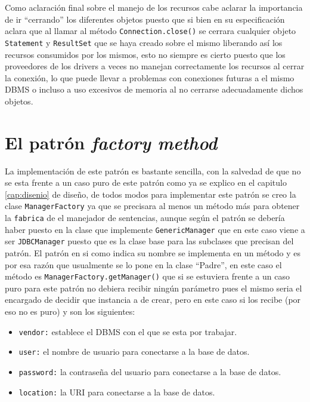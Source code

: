Como aclaración final sobre el manejo de los recursos cabe aclarar la importancia de ir ``cerrando'' los diferentes objetos puesto que si bien \jd en su especificación aclara que al llamar al método \verb=Connection.close()= se cerrara cualquier objeto \verb=Statement= y \verb=ResultSet= que se haya creado sobre el mismo liberando así los recursos consumidos por los mismos, esto no siempre es cierto puesto que los proveedores de los drivers \jd a veces no manejan correctamente los recursos al cerrar la conexión, lo que puede llevar a problemas con conexiones futuras a el mismo DBMS o incluso a uso excesivos de memoria al no cerrarse adecuadamente dichos objetos.
%
\section{El patrón \textit{factory method}}
La implementación de este patrón es bastante sencilla, con la salvedad de que no se esta frente a un caso puro de este patrón como ya se explico en el capitulo \ref{cap:disenio} de diseño, de todos modos para implementar este patrón se creo la clase \verb=ManagerFactory= ya que se precisara al menos un método más para obtener la \verb=fabrica= de el manejador de sentencias,  aunque según el patrón se debería haber puesto en la clase que implemente \verb=GenericManager= que en este caso viene a ser \verb=JDBCManager= puesto que es la clase base para las subclases que precisan del patrón. El patrón en si como indica su nombre se implementa en un método y es por esa razón que usualmente se lo pone en la clase ``Padre'', en este caso el método es \verb=ManagerFactory.getManager()= que si se estuviera frente a un caso puro para este patrón no debiera recibir ningún parámetro pues el mismo seria el encargado de decidir que instancia a  de crear, pero en este caso si los recibe (por eso no es puro) y son los siguientes:
\begin{itemize}
\item \verb=vendor:= establece el DBMS con el que se esta por trabajar.
\item \verb=user:= el nombre de usuario para conectarse a la base de datos.
\item \verb=password:= la contraseña del usuario para conectarse a la base de datos.
\item \verb=location:= la URI para conectarse a la base de datos.
\end{itemize}
